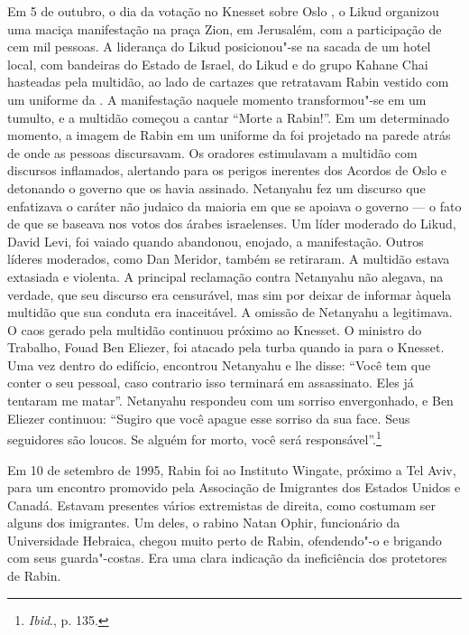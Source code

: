 Em 5 de outubro, o dia da votação no Knesset sobre Oslo , o Likud
organizou uma maciça manifestação na praça Zion, em Jerusalém, com a
participação de cem mil pessoas. A liderança do Likud posicionou"-se na
sacada de um hotel local, com bandeiras do Estado de Israel, do Likud e
do grupo Kahane Chai hasteadas pela multidão, ao lado de cartazes que
retratavam Rabin vestido com um uniforme da . A manifestação naquele
momento transformou"-se em um tumulto, e a multidão começou a cantar
``Morte a Rabin!''. Em um determinado momento, a imagem de Rabin em um
uniforme da  foi projetado na parede atrás de onde as pessoas
discursavam. Os oradores estimulavam a multidão com discursos
inflamados, alertando para os perigos inerentes dos Acordos de Oslo e
detonando o governo que os havia assinado. Netanyahu fez um discurso que
enfatizava o caráter não judaico da maioria em que se apoiava o governo
--- o fato de que se baseava nos votos dos árabes israelenses. Um líder
moderado do Likud, David Levi, foi vaiado quando abandonou, enojado, a
manifestação. Outros líderes moderados, como Dan Meridor, também se
retiraram. A multidão estava extasiada e violenta. A principal
reclamação contra Netanyahu não alegava, na verdade, que seu discurso era
censurável, mas sim por deixar de informar àquela multidão que sua
conduta era inaceitável. A omissão de Netanyahu a legitimava. O caos
gerado pela multidão continuou próximo ao Knesset. O ministro do
Trabalho, Fouad Ben Eliezer, foi atacado pela turba quando ia para o
Knesset. Uma vez dentro do edifício, encontrou Netanyahu e lhe disse:
``Você tem que conter o seu pessoal, caso contrario isso terminará em
assassinato. Eles já tentaram me matar''. Netanyahu respondeu com um
sorriso envergonhado, e Ben Eliezer continuou: ``Sugiro que você apague
esse sorriso da sua face. Seus seguidores são loucos. Se alguém for
morto, você será responsável''.\footnote{\emph{Ibid}., p. 135.}

Em 10 de setembro de 1995, Rabin foi ao Instituto Wingate, próximo a Tel
Aviv, para um encontro promovido pela Associação de Imigrantes dos
Estados Unidos e Canadá. Estavam presentes vários extremistas de
direita, como costumam ser alguns dos imigrantes. Um deles, o rabino
Natan Ophir, funcionário da Universidade Hebraica, chegou muito perto de
Rabin, ofendendo"-o e brigando com seus guarda"-costas. Era uma clara
indicação da ineficiência dos protetores de Rabin.

